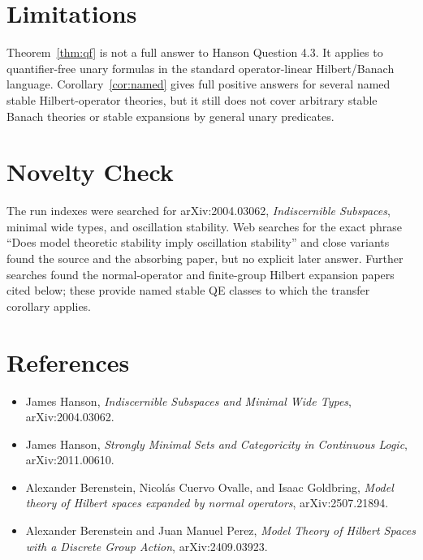 \documentclass[11pt]{article}
\begin{document}
\section*{Limitations}

Theorem~\ref{thm:qf} is not a full answer to Hanson Question 4.3.  It applies
to quantifier-free unary formulas in the standard operator-linear
Hilbert/Banach language.  Corollary~\ref{cor:named} gives full positive
answers for several named stable Hilbert-operator theories, but it still does
not cover arbitrary stable Banach theories or stable expansions by general
unary predicates.

\section*{Novelty Check}

The run indexes were searched for arXiv:2004.03062, \emph{Indiscernible
Subspaces}, minimal wide types, and oscillation stability.  Web searches for
the exact phrase ``Does model theoretic stability imply oscillation stability''
and close variants found the source and the absorbing paper, but no explicit
later answer.  Further searches found the normal-operator and finite-group
Hilbert expansion papers cited below; these provide named stable QE classes to
which the transfer corollary applies.

\section*{References}

\begin{itemize}
\item James Hanson, \emph{Indiscernible Subspaces and Minimal Wide Types},
  arXiv:2004.03062.
\item James Hanson, \emph{Strongly Minimal Sets and Categoricity in Continuous
  Logic}, arXiv:2011.00610.
\item Alexander Berenstein, Nicol\'as Cuervo Ovalle, and Isaac Goldbring,
  \emph{Model theory of Hilbert spaces expanded by normal operators},
  arXiv:2507.21894.
\item Alexander Berenstein and Juan Manuel Perez,
  \emph{Model Theory of Hilbert Spaces with a Discrete Group Action},
  arXiv:2409.03923.
\end{itemize}
\end{document}
